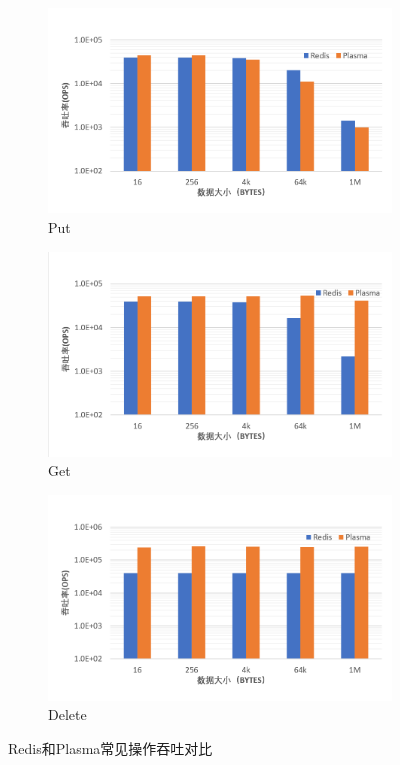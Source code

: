 \begin{figure}[h]
    \begin{subfigure}{0.33\textwidth}
        \includegraphics[width=\textwidth]{image/chap02/set.png}
        \caption{Put}
    \end{subfigure}
    \begin{subfigure}{0.33\textwidth}
        \includegraphics[width=\textwidth]{image/chap02/get.png}
        \caption{Get}
    \end{subfigure}
    \begin{subfigure}{0.33\textwidth}
        \includegraphics[width=\textwidth]{image/chap02/del.png}
        \caption{Delete}
    \end{subfigure}
    \caption{Redis和Plasma常见操作吞吐对比}
    \label{fig:local_bench}
\end{figure}

